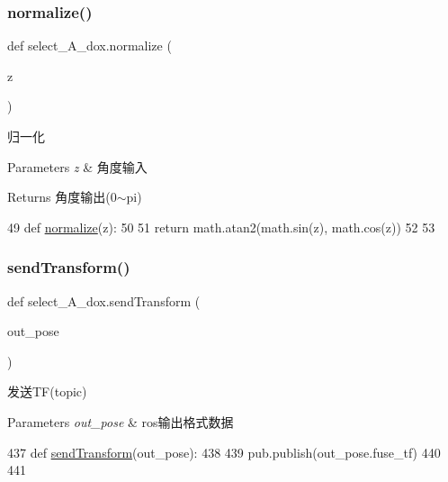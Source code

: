 \subsubsection{\texorpdfstring{normalize()}{normalize()}}
{\footnotesize\ttfamily def select\+\_\+\+A\+\_\+dox.\+normalize (\begin{DoxyParamCaption}\item[{}]{z }\end{DoxyParamCaption})}



归一化 


\begin{DoxyParams}{Parameters}
{\em z} & 角度输入\\
\hline
\end{DoxyParams}
\begin{DoxyReturn}{Returns}
角度输出(0$\sim$pi) 
\end{DoxyReturn}

\begin{DoxyCode}
49 \textcolor{keyword}{def }\hyperlink{namespaceselect___a__dox_a933f572519bc5396421db86a68a37916}{normalize}(z):
50 
51     \textcolor{keywordflow}{return} math.atan2(math.sin(z), math.cos(z))
52 
53 
\end{DoxyCode}
\mbox{\label{namespaceselect___a__dox_a6b1af471c24514010bab83a744995d30}} 
\subsubsection{\texorpdfstring{send\+Transform()}{sendTransform()}}
{\footnotesize\ttfamily def select\+\_\+\+A\+\_\+dox.\+send\+Transform (\begin{DoxyParamCaption}\item[{}]{out\+\_\+pose }\end{DoxyParamCaption})}



发送\+T\+F(topic) 


\begin{DoxyParams}{Parameters}
{\em out\+\_\+pose} & ros输出格式数据 \\
\hline
\end{DoxyParams}

\begin{DoxyCode}
437 \textcolor{keyword}{def }\hyperlink{namespaceselect___a__dox_a6b1af471c24514010bab83a744995d30}{sendTransform}(out\_pose):
438 
439     pub.publish(out\_pose.fuse\_tf)
440 
441 
\end{DoxyCode}
\mbox{\label{namespaceselect___a__dox_a7b416b405b394ffdf3fb7ca9d91bd896}} 
